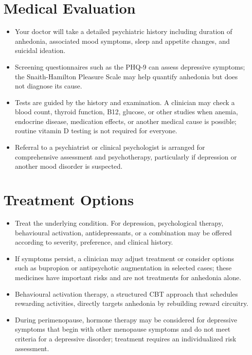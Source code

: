 \section*{Medical Evaluation}
\begin{itemize}
 \item Your doctor will take a detailed psychiatric history including duration of anhedonia, associated mood symptoms, sleep and appetite changes, and suicidal ideation.
 \item Screening questionnaires such as the PHQ-9 can assess depressive symptoms; the Snaith-Hamilton Pleasure Scale may help quantify anhedonia but does not diagnose its cause.
 \item Tests are guided by the history and examination. A clinician may check a blood count, thyroid function, B12, glucose, or other studies when anemia, endocrine disease, medication effects, or another medical cause is possible; routine vitamin D testing is not required for everyone.
 \item Referral to a psychiatrist or clinical psychologist is arranged for comprehensive assessment and psychotherapy, particularly if depression or another mood disorder is suspected.
\end{itemize}

\section*{Treatment Options}
\begin{itemize}
 \item Treat the underlying condition. For depression, psychological therapy, behavioural activation, antidepressants, or a combination may be offered according to severity, preference, and clinical history.
 \item If symptoms persist, a clinician may adjust treatment or consider options such as bupropion or antipsychotic augmentation in selected cases; these medicines have important risks and are not treatments for anhedonia alone.
 \item Behavioural activation therapy, a structured CBT approach that schedules rewarding activities, directly targets anhedonia by rebuilding reward circuitry.
 \item During perimenopause, hormone therapy may be considered for depressive symptoms that begin with other menopause symptoms and do not meet criteria for a depressive disorder; treatment requires an individualized risk assessment.
\end{itemize}

